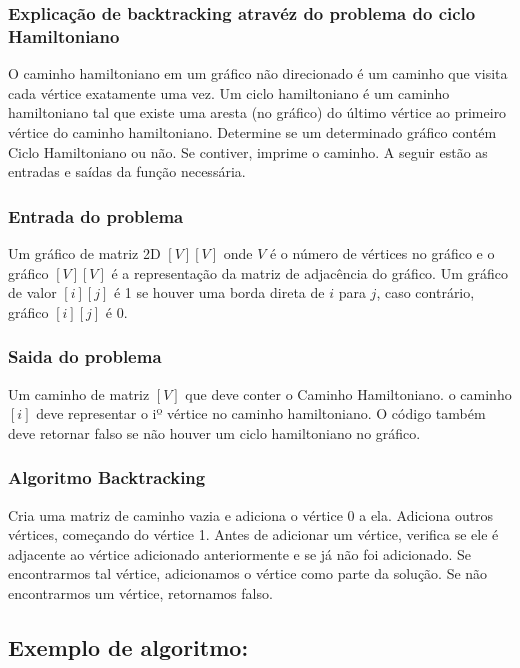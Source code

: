 \subsubsection*{Explicação de backtracking atravéz do problema do ciclo Hamiltoniano}

O caminho hamiltoniano em um gráfico não direcionado é um caminho que visita cada vértice exatamente uma vez. 
Um ciclo hamiltoniano é um caminho hamiltoniano tal que existe uma aresta (no gráfico) do último vértice ao primeiro vértice do caminho hamiltoniano. 
Determine se um determinado gráfico contém Ciclo Hamiltoniano ou não. Se contiver, imprime o caminho. A seguir estão as entradas e saídas da função necessária.

\subsubsection*{Entrada do problema}

Um gráfico de matriz 2D $[V] [V]$ onde $V$ é o número de vértices no gráfico e o gráfico $[V] [V]$ é a representação da matriz de adjacência do gráfico. 
Um gráfico de valor $[i] [j]$ é 1 se houver uma borda direta de $i$ para $j$, caso contrário, gráfico $[i] [j]$ é 0.

\subsubsection*{Saida do problema}

Um caminho de matriz $[V]$ que deve conter o Caminho Hamiltoniano. o caminho $[i]$ deve representar o iº vértice no caminho hamiltoniano. 
O código também deve retornar falso se não houver um ciclo hamiltoniano no gráfico.

\subsubsection*{Algoritmo Backtracking}  

Cria uma matriz de caminho vazia e adiciona o vértice 0 a ela. 
Adiciona outros vértices, começando do vértice 1. 
Antes de adicionar um vértice, verifica se ele é adjacente ao vértice adicionado anteriormente e se já não foi adicionado. 
Se encontrarmos tal vértice, adicionamos o vértice como parte da solução. 
Se não encontrarmos um vértice, retornamos falso.

\subsection{Exemplo de algoritmo:}

